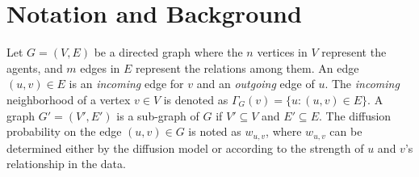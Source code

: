 \documentclass[10pt,journal,compsoc]{IEEEtran}
\begin{document}
\section{Notation and Background}\label{sec:background}

Let $G = (V,E)$ be a directed graph where the $n$ vertices in $V$ represent the agents, and $m$ edges in $E$ represent the relations among them. An edge $(u,v) \in E$ is an {\em incoming} edge for $v$ and an {\em outgoing} edge of $u$. The {\em incoming} neighborhood of a vertex $v \in V$ is denoted as $\Gamma_{G}(v) = \{u: (u,v) \in E\}$. A graph $G' = (V',E')$ is a sub-graph of $G$ if $V' \subseteq V$ and $E' \subseteq E$. The diffusion probability on the edge $(u, v) \in G$ is noted as $w_{u,v}$, where $w_{u,v}$ can be determined either by the diffusion model or according to the strength of $u$ and $v$'s relationship in the data.
\end{document}
